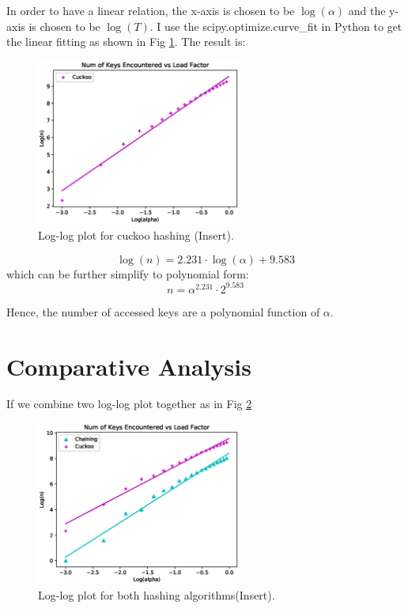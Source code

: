 \documentclass{article}
\begin{document}
\begin{spacing}{1.2}
\begin{itemize}
    In order to have a linear relation, the x-axis is chosen to be $\log(\alpha)$ and the y-axis is chosen to be $\log(T)$. I use the scipy.optimize.curve\_fit in Python to get the linear fitting as shown in Fig \ref{cuckoo-insert}. The result is:
    \begin{figure}[!htb]
        \centering
        \includegraphics[width=0.6\textwidth]{../output/fig/insert_cuckoo.eps}
        \caption{Log-log plot for cuckoo hashing (Insert).}
        \label{cuckoo-insert}
    \end{figure}
    
    \begin{equation*}
        \log(n) = 2.231 \cdot \log(\alpha) + 9.583
    \end{equation*}
    which can be further simplify to polynomial form:
    \begin{equation*}
        n = \alpha^{2.231}\cdot 2^{9.583}
    \end{equation*}

    Hence, the number of accessed keys are a polynomial function of $\alpha$.
\end{itemize}
\section{Comparative Analysis}
If we combine two log-log plot together as in Fig \ref{insert}

\begin{figure}[!htb]
    \centering
    \includegraphics[width=0.6\textwidth]{../output/fig/insert.eps}
    \caption{Log-log plot for both hashing algorithms(Insert).}
    \label{insert}
\end{figure}


\end{spacing}
\end{document}
